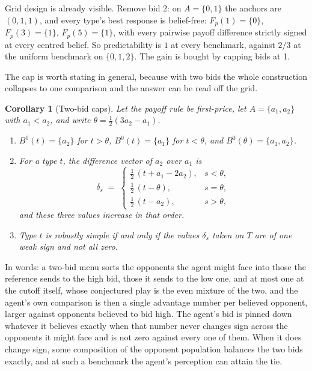 \documentclass[12pt]{article}
\newtheorem{corollary}{Corollary}
\theoremstyle{definition}
\begin{document}
Grid design is already visible. Remove bid 2: on $A = \{0, 1\}$ the anchors are $(0, 1, 1)$, and every type's best response is belief-free: $F_p(1) = \{0\}$, $F_p(3) = \{1\}$, $F_p(5) = \{1\}$, with every pairwise payoff difference strictly signed at every centred belief. So predictability is $1$ at every benchmark, against $2/3$ at the uniform benchmark on $\{0, 1, 2\}$. The gain is bought by capping bids at 1.

The cap is worth stating in general, because with two bids the whole construction collapses to one comparison and the answer can be read off the grid.

\begin{corollary}[Two-bid caps]\label{prop:cap}
Let the payoff rule be first-price, let $A = \{a_1, a_2\}$ with $a_1 < a_2$, and write $\theta = \tfrac{1}{2}(3 a_2 - a_1)$.
\begin{enumerate}
\item[i.] $B^0(t) = \{a_2\}$ for $t > \theta$, $B^0(t) = \{a_1\}$ for $t < \theta$, and $B^0(\theta) = \{a_1, a_2\}$.
\item[ii.] For a type $t$, the difference vector of $a_2$ over $a_1$ is
\[
\delta_s \;=\;
\begin{cases}
\tfrac12\,(t + a_1 - 2a_2), & s < \theta, \\[2pt]
\tfrac12\,(t - \theta),     & s = \theta, \\[2pt]
\tfrac12\,(t - a_2),        & s > \theta,
\end{cases}
\]
and these three values increase in that order.
\item[iii.] Type $t$ is robustly simple if and only if the values $\delta_s$ taken on $T$ are of one weak sign and not all zero.
\end{enumerate}
\end{corollary}

In words: a two-bid menu sorts the opponents the agent might face into those the reference sends to the high bid, those it sends to the low one, and at most one at the cutoff itself, whose conjectured play is the even mixture of the two, and the agent's own comparison is then a single advantage number per believed opponent, larger against opponents believed to bid high. The agent's bid is pinned down whatever it believes exactly when that number never changes sign across the opponents it might face and is not zero against every one of them. When it does change sign, some composition of the opponent population balances the two bids exactly, and at such a benchmark the agent's perception can attain the tie.
\end{document}
